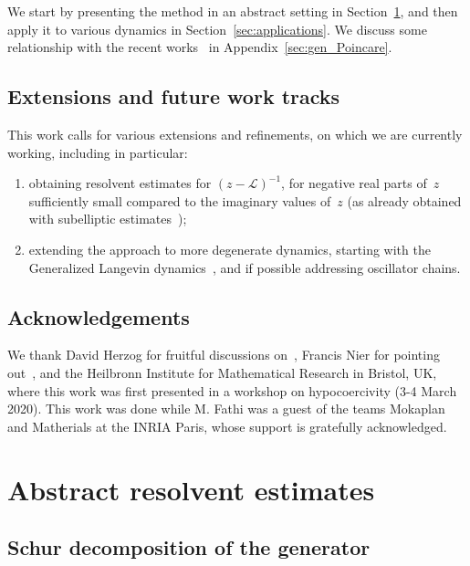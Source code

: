 \documentclass[AHL,Unicode,longabstracts,MathTools,published]{cedram}
\newcommand{\cL}{\mathcal{L}}
\newcommand*{\romanenumi}{\renewcommand*{\theenumi}{\roman{enumi}}}
\begin{document}
We start by presenting the method in an abstract setting in Section~\ref{sec:abstract}, and then apply it to various dynamics in Section~\ref{sec:applications}. We discuss some relationship with the recent works~\cite{AM19,CLW19} in Appendix~\ref{sec:gen_Poincare}.

\subsection*{Extensions and future work tracks}
This work calls for various extensions and refinements, on which we are currently working, including in particular:
\begin{enumerate}\romanenumi
\item obtaining resolvent estimates for $(z -\cL)^{-1}$, for negative real parts of~$z$ sufficiently small compared to the imaginary values of~$z$ (as already obtained with subelliptic estimates~\cite{EH03,HN04,HN05});
\item extending the approach to more degenerate dynamics, starting with the Generalized Langevin dynamics~\cite{OP11}, and if possible addressing oscillator chains.
\end{enumerate}

\subsection*{Acknowledgements}
We thank David Herzog for fruitful discussions on~\cite{AM19,CLW19}, Francis Nier for pointing out~\cite{SZ07}, and the Heilbronn Institute for Mathematical Research in Bristol, UK, where this work was first presented in a workshop on hypocoercivity (3-4 March 2020). This work was done while M. Fathi was a guest of the teams Mokaplan and Matherials at the INRIA Paris, whose support is gratefully acknowledged.

\section{Abstract resolvent estimates}\label{sec:abstract}

\subsection{Schur decomposition of the generator}
\end{document}
